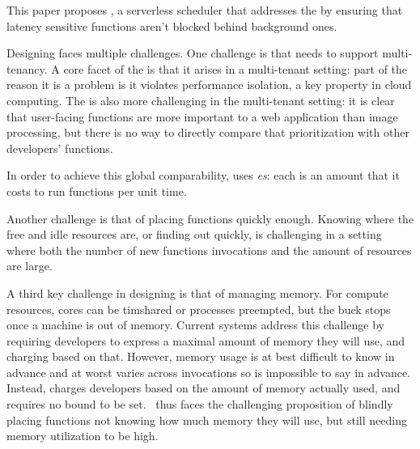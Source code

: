 This paper proposes \sys{}, a serverless scheduler that addresses the \problem{}
by ensuring that latency sensitive functions aren't blocked behind background
ones.

Designing \sys{} faces multiple challenges. One challenge is that \sys{} needs
to support multi-tenancy. A core facet of the \problem{} is that it arises in a
multi-tenant setting: part of the reason it is a problem is it violates
performance isolation, a key property in cloud computing. The \problem{} is also
more challenging in the multi-tenant setting: it is clear that user-facing
functions are more important to a web application than image processing, but
there is no way to directly compare that prioritization with other developers'
functions.

In order to achieve this global comparability, \sys{} uses
\emph{\priceclass{}es}: each \priceclass{} is an amount that it costs to run
functions per unit time. 

Another challenge is that of placing functions quickly enough. Knowing where the
free and idle resources are, or finding out quickly, is challenging in a setting
where both the number of new functions invocations and the amount of resources
are large.


A third key challenge in designing \sys{} is that of managing memory. For
compute resources, cores can be timshared or processes preempted, but the buck
stops once a machine is out of memory. Current systems address this challenge by
requiring developers to express a maximal amount of memory they will use, and
charging based on that. However, memory usage is at best difficult to know in
advance and at worst varies across invocations so is impossible to say in
advance. Instead, \sys{} charges developers based on the amount of memory
actually used, and requires no bound to be set.~\Sys{} thus faces the
challenging proposition of blindly placing functions not knowing how much memory
they will use, but still needing memory utilization to be high.
 
